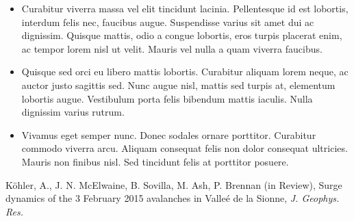 \documentclass[unknownkeysallowed,usepdftitle=false, parskip=full]{beamer}
\newcommand{\secvariable}{nothing}
\newcommand{\mysection}[1]{\renewcommand{\secvariable}{#1}
}
\begin{document}
\mysection{credits}
\begin{frame}\label{\secvariable}
  
  \begin{itemize}
   \item Curabitur viverra massa vel elit tincidunt lacinia. Pellentesque id est lobortis, interdum felis nec, faucibus augue. Suspendisse varius sit amet dui ac dignissim. Quisque mattis, odio a congue lobortis, eros turpis placerat enim, ac tempor lorem nisl ut velit. Mauris vel nulla a quam viverra faucibus. 
  \item Quisque sed orci eu libero mattis lobortis. Curabitur aliquam lorem neque, ac auctor justo sagittis sed. Nunc augue nisl, mattis sed turpis at, elementum lobortis augue. Vestibulum porta felis bibendum mattis iaculis. Nulla dignissim varius rutrum.
  \item Vivamus eget semper nunc. Donec sodales ornare porttitor. Curabitur commodo viverra arcu. Aliquam consequat felis non dolor consequat ultricies. Mauris non finibus nisl. Sed tincidunt felis at porttitor posuere.

  \end{itemize}

  K\"ohler, A., J. N. McElwaine, B. Sovilla, M. Ash, P. Brennan (in Review),
Surge dynamics of the 3 February 2015 avalanches in Valle\'e de la Sionne,
\textit{J. Geophys. Res.} 
  
\end{frame}
\end{document}
